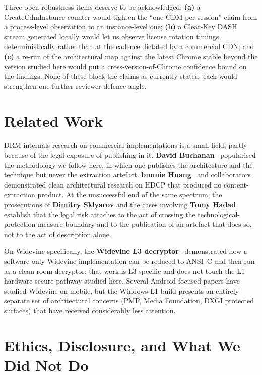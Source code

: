 \documentclass[11pt,letterpaper]{article}
\begin{document}
\noindent Three open robustness items deserve to be acknowledged:
\textbf{(a)} a CreateCdmInstance counter would tighten the
``one CDM per session'' claim from a process-level observation to
an instance-level one; \textbf{(b)} a Clear-Key DASH stream
generated locally would let us observe license rotation timings
deterministically rather than at the cadence dictated by a
commercial CDN; and \textbf{(c)} a re-run of the architectural map
against the latest Chrome stable beyond the version studied here
would put a cross-version-of-Chrome confidence bound on the
findings.  None of these block the claims as currently stated;
each would strengthen one further reviewer-defence angle.

\section{Related Work}
\label{sec:related}

DRM internals research on commercial implementations is a small
field, partly because of the legal exposure of publishing in it.
\textbf{David Buchanan}~\cite{buchanan} popularised the
methodology we follow here, in which one publishes the architecture
and the technique but never the extraction artefact.
\textbf{bunnie Huang}~\cite{nettv} and collaborators demonstrated
clean architectural research on HDCP that produced no
content-extraction product.  At the unsuccessful end of the same
spectrum, the prosecutions of
\textbf{Dimitry Sklyarov} and the cases involving
\textbf{Tomy Hadad} establish that the legal risk attaches to the
act of crossing the technological-protection-measure boundary and
to the publication of an artefact that does so, not to the act of
description alone.

On Widevine specifically, the
\textbf{Widevine L3 decryptor}~\cite{widevine-l3} demonstrated how a
software-only Widevine implementation can be reduced to ANSI~C and
then run as a clean-room decryptor; that work is L3-specific and
does not touch the L1 hardware-secure pathway studied here.
Several Android-focused papers have studied Widevine on mobile, but
the Windows L1 build presents an entirely separate set of
architectural concerns (PMP, Media Foundation, DXGI protected
surfaces) that have received considerably less attention.

\section{Ethics, Disclosure, and What We Did Not Do}
\label{sec:ethics}
\end{document}
